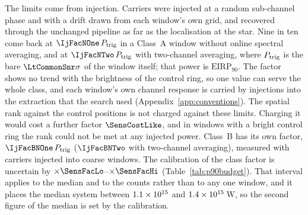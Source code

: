 The limits come from injection. Carriers were injected at a random
sub-channel phase and with a drift drawn from each window's own grid, and
recovered through the unchanged pipeline as far as the localisation at the
star. Nine in ten come back at $\IjFacNOne\,P_{\rm trig}$ in a Class~A window
without online spectral averaging, and at $\IjFacNTwo\,P_{\rm trig}$ with
two-channel averaging, where $P_{\rm trig}$ is the bare
$\LtCommonSnr\sigma$ of the window itself; that power is
$\mathrm{EIRP}_{90}$. The factor shows no trend with the brightness of the
control ring, so one value can serve the whole class, and each window's own
channel response is carried by injections into the extraction that the
search used (Appendix~\ref{app:conventions}). The spatial rank against the
\NCtrl{} control positions is not charged against these limits. Charging it
would cost a further factor $\SensCostLike$, and in \SensNRingHiUnres{}
windows with a bright control ring the rank could not be met at any injected
power. Class~B has its own factor, $\IjFacBNOne\,P_{\rm trig}$
($\IjFacBNTwo$ with two-channel averaging), measured with \SensNToneCoarse{}
carriers injected into \SensNInjCoarse{} coarse windows. The calibration of
the class factor is uncertain by $\times\SensFacLo$--$\times\SensFacHi$
(Table~\ref{tab:p90budget}). That interval applies to the median and to the
counts rather than to any one window, and it places the median system
between $1.1\times10^{15}$ and $1.4\times10^{15}$\,W, so the second figure of the
median is set by the calibration.

